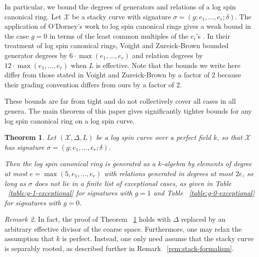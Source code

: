 \documentclass{amsart}
\theoremstyle{plain}
\newtheorem{thm}{Theorem}[section]
\theoremstyle{definition}
\theoremstyle{remark}
\newtheorem{rem}[thm]{Remark}
\numberwithin{equation}{section}
\DeclareMathOperator\di{Div}
\newcommand\sx{\mathscr X}
\newcommand \subhalf[1]{\frac{{#1} - 1}{2{#1}}}
\newcommand{\halfcan}{L}
\begin{document}

In particular, we bound the degrees of generators and relations of a
log spin canonical ring. Let
$\sx$ be a stacky curve with signature $\sigma = (g; e_1, \ldots,
e_r; \delta)$. The application of O'Dorney's work to log spin
canonical rings gives a weak bound in the case $g = 0$ in
terms of the least common multiples of the $e_i$'s \cite[Chapter 5]
{dorney:canonical}. In their treatment of log spin canonical
rings, Voight and Zureick-Brown \cite[Corollary 10.4.6]{vzb:stacky} bounded generator degrees by $6 \cdot \max(e_1, \ldots, e_r)$
and relation degrees by $12 \cdot \max(e_1, \ldots, e_r)$ when $\halfcan$ is effective. Note that the bounds we write here differ from those stated in Voight and Zureick-Brown \cite[Corollary 10.4.6]{vzb:stacky} by a factor of 2 because their grading convention differs from ours by a factor of 2.

These bounds are far from tight and do not collectively
cover all cases in all genera. The main theorem of this paper
gives significantly tighter bounds for any log spin canonical ring on a log spin curve.

\begin{thm}
\label{thm:main}
Let $(\sx, \Delta, \halfcan)$ be a log spin curve over a perfect
field $k$, so that $\sx$ has signature $\sigma = (g; e_1, \ldots,
e_r; \delta)$.

Then the log spin canonical ring is generated as a $k$-algebra by 
elements of degree at most $e = \max(5, e_1, \ldots, e_r)$ with
relations generated in degrees at most $2e$,
so long as $\sigma$ does not lie in a finite list of exceptional
cases, as given in Table ~\ref{table:g-1-exceptional} for
signatures with $g = 1$ and Table ~\ref{table:g-0-exceptional} for
signatures with $g = 0$.
\end{thm}

\begin{rem}
\label{rem:main-weaker-assumptions}
In fact, the proof of Theorem ~\ref{thm:main} holds with $\Delta$ replaced by an arbitrary effective divisor of the coarse space.
 Furthermore, one may relax the assumption that $k$ is perfect. Instead, one only need assume that the stacky curve
is separably rooted, as described further in Remark ~\ref{rem:stack-formalism}.
\end{rem}
\end{document}
